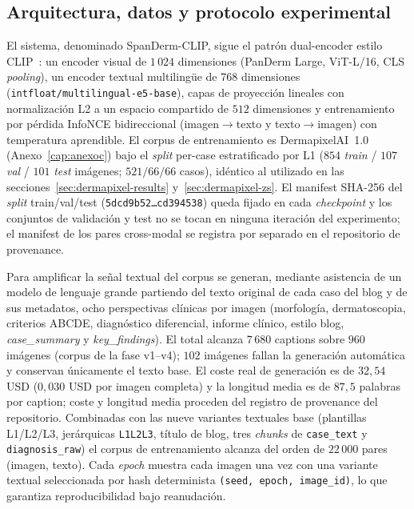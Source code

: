 \subsection*{Arquitectura, datos y protocolo experimental}

El sistema, denominado SpanDerm-CLIP, sigue el patrón dual-encoder
estilo CLIP~\cite{clip2021}: un encoder visual de
$1\,024$ dimensiones (PanDerm Large, ViT-L/16, CLS \emph{pooling}),
un encoder textual multilingüe de $768$ dimensiones
(\texttt{intfloat/multilingual-e5-base}), capas de proyección
lineales con normalización L2 a un espacio compartido de
$512$ dimensiones y entrenamiento por pérdida InfoNCE bidireccional
(imagen$\to$texto y texto$\to$imagen) con temperatura aprendible.
El corpus de entrenamiento es DermapixelAI~1.0
(Anexo~\ref{cap:anexoc}) bajo el \emph{split} per-case estratificado
por L1 ($854$ \emph{train} / $107$ \emph{val} / $101$ \emph{test}
imágenes; $521 / 66 / 66$ casos), idéntico al utilizado en las
secciones~\ref{sec:dermapixel-results} y~\ref{sec:dermapixel-zs}.
El manifest SHA-256 del \emph{split} train/val/test
(\texttt{5dcd9b52\dots cd394538}) queda fijado en cada
\emph{checkpoint} y los conjuntos de validación y test no se tocan
en ninguna iteración del experimento; el manifest de los pares
cross-modal se registra por separado en el repositorio de
provenance.

Para amplificar la señal textual del corpus se generan, mediante
asistencia de un modelo de lenguaje grande partiendo del texto original
de cada caso del blog y de sus metadatos, ocho perspectivas
clínicas por imagen (morfología, dermatoscopia, criterios ABCDE,
diagnóstico diferencial, informe clínico, estilo blog,
\emph{case\_summary} y \emph{key\_findings}). El total alcanza
$7\,680$ captions sobre $960$ imágenes (corpus de la fase v1--v4);
$102$ imágenes fallan la
generación automática y conservan únicamente el texto base. El
coste real de generación es de $32{,}54$ USD ($0{,}030$ USD por
imagen completa) y la longitud media es de $87{,}5$ palabras por
caption; coste y longitud media proceden del registro de
provenance del repositorio. Combinadas con las nueve variantes textuales base
(plantillas L1/L2/L3, jerárquicas \texttt{L1L2L3}, título de blog,
tres \emph{chunks} de \texttt{case\_text} y
\texttt{diagnosis\_raw}) el corpus de entrenamiento alcanza del
orden de $22\,000$ pares (imagen, texto). Cada \emph{epoch} muestra
cada imagen una vez con una variante textual seleccionada por hash
determinista \texttt{(seed, epoch, image\_id)}, lo que garantiza
reproducibilidad bajo reanudación.


